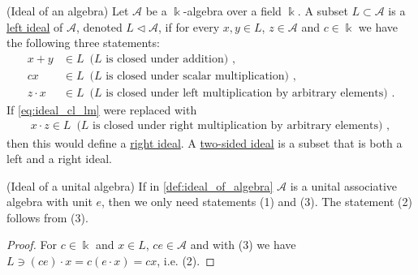 \begin{definition}{(Ideal of an algebra)}\label{def:ideal_of_algebra}
Let $\mathcal{A}$ be a $\Bbbk$-algebra over a field $\Bbbk$.
A subset $L \subset \mathcal{A}$ is a \ul{left ideal} of $\mathcal{A}$, denoted $L \vartriangleleft \mathcal{A}$, if for every $x, y \in L$,
$z \in \mathcal{A}$ and $c \in \Bbbk$ we have the following three statements:
\begin{align}
x + y &\in L\, \text{ ($L$ is closed under addition) },\label{eq:ideal_cl_add} \\
cx &\in L\, \text{ ($L$ is closed under scalar multiplication) }, \label{eq:ideal_cl_scm} \\
z \cdot x &\in L\, \text{ ($L$ is closed under left multiplication by arbitrary elements) }. \label{eq:ideal_cl_lm}
\end{align}
\noindent If \eqref{eq:ideal_cl_lm} were replaced with
\begin{align}
x \cdot z \in L\, \text{ ($L$ is closed under right multiplication by arbitrary elements) }, \label{eq:ideal_cl_rm}
\end{align}
then this would define a \ul{right ideal}.
A \ul{two-sided ideal} is a subset that is both a left and a right ideal.
\end{definition}

\begin{remark}{(Ideal of a unital algebra)}
If in \ref{def:ideal_of_algebra} $\mathcal{A}$ is a unital associative algebra with unit $e$, then we only need statements
(1) and (3). The statement (2) follows from (3).
\end{remark}
\begin{proof}
For $c \in \Bbbk$ and $x\in L$, $ce \in \mathcal{A}$ and with (3) we have $L \ni (ce)\cdot x = c(e\cdot x) = cx$, i.e. (2).
\end{proof}

